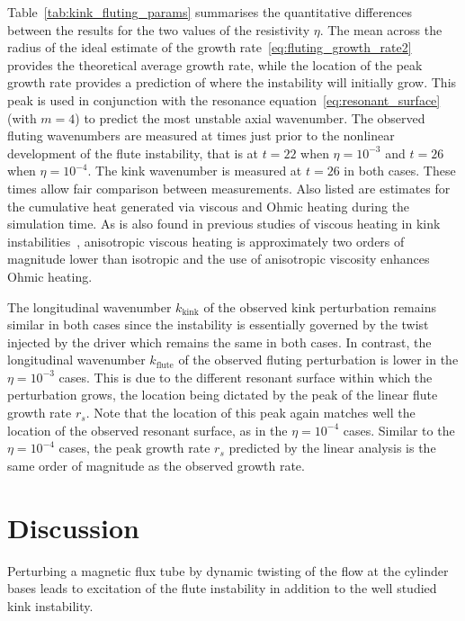 \documentclass[fleqn,usenatbib]{mnras}
\newcommand{\rev}[1]{{\color{red} {#1}}}
\begin{document}
Table~\ref{tab:kink_fluting_params} summarises the quantitative differences
between the results for the two values of the resistivity $\eta$. \rev{The mean
across the radius of the ideal estimate of the growth
rate~\eqref{eq:fluting_growth_rate2} provides the theoretical average growth
rate, while the location of the peak growth rate provides a prediction of where
the instability will initially grow. This peak is used in conjunction with the
resonance equation~\eqref{eq:resonant_surface} (with $m=4$) to predict the most
unstable axial wavenumber.} The observed fluting wavenumbers are measured at
times just prior to the nonlinear development of the flute instability, that is
at $t=22$ when $\eta=10^{-3}$ and $t=26$ when $\eta = 10^{-4}$. The kink
wavenumber is measured at $t=26$ in both cases. These times allow fair
comparison between measurements. Also listed are estimates for the cumulative
heat generated via viscous and Ohmic heating during the simulation time. As is
also found in previous studies of viscous heating in kink
instabilities~\citep{quinnEffectAnisotropicViscosity2020}, anisotropic viscous
heating is approximately two orders of magnitude lower than isotropic and the
use of anisotropic viscosity enhances Ohmic heating.

The longitudinal wavenumber $k_{\text{kink}}$ of the observed kink perturbation
remains similar in both cases since the instability is essentially governed by
the twist injected by the driver which remains the same in both cases. In
contrast, the longitudinal wavenumber $k_{\text{flute}}$ of the observed
fluting perturbation is lower in the $\eta=10^{-3}$ cases. This is due to the
different resonant surface within which the perturbation grows, the location
being dictated by the peak of the linear \rev{flute growth rate $r_s$}. Note that the location of
this peak again matches well the location of the observed resonant surface, as
in the $\eta=10^{-4}$ cases. Similar to the $\eta=10^{-4}$ cases, the \rev{peak
growth rate $r_s$} predicted by the linear analysis is the same order of magnitude as
the observed growth rate.

\section{Discussion}
\label{sec-discussion}

\rev{Perturbing a magnetic flux tube by dynamic twisting of the flow
at the cylinder bases leads to excitation of the flute instability in
addition to the well studied kink instability.}
\end{document}
